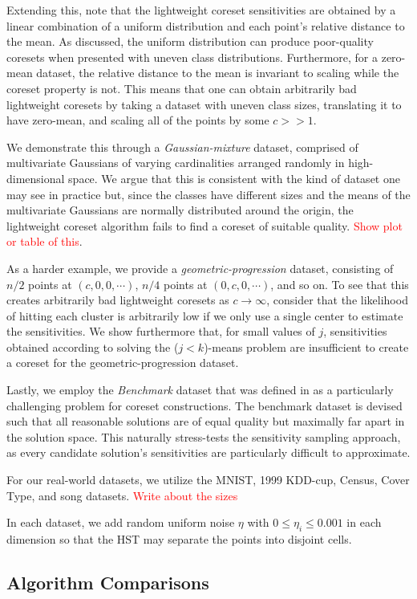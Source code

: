 Extending this, note that the lightweight coreset sensitivities are obtained by a linear combination of a uniform distribution and each point's relative
distance to the mean. As discussed, the uniform distribution can produce poor-quality coresets when presented with uneven class distributions. Furthermore, for
a zero-mean dataset, the relative distance to the mean is invariant to scaling while the coreset property is not. This means that one can obtain arbitrarily
bad lightweight coresets by taking a dataset with uneven class sizes, translating it to have zero-mean, and scaling all of the points by some $c >> 1$.

We demonstrate this through a \emph{Gaussian-mixture} dataset, comprised of multivariate Gaussians of varying cardinalities arranged randomly in
high-dimensional space. We argue that this is consistent with the kind of dataset one may see in practice but, since the classes have different sizes and the
means of the multivariate Gaussians are normally distributed around the origin, the lightweight coreset algorithm fails to find a coreset of suitable
quality. \textcolor{red}{Show plot or table of this}.

As a harder example, we provide a \emph{geometric-progression} dataset, consisting of $n/2$ points at $(c, 0, 0, \cdots)$, $n/4$ points at $(0, c, 0, \cdots)$,
and so on. To see that this creates arbitrarily bad lightweight coresets as $c \rightarrow \infty$, consider that the likelihood of hitting each cluster is
arbitrarily low if we only use a single center to estimate the sensitivities. We show furthermore that, for small values of $j$, sensitivities obtained
according to solving the ($j<k$)-means problem are insufficient to create a coreset for the geometric-progression dataset.

Lastly, we employ the \emph{Benchmark} dataset that was defined in \cite{chrisESA} as a particularly challenging problem for coreset constructions.  The
benchmark dataset is devised such that all reasonable solutions are of equal quality but maximally far apart in the solution space. This naturally stress-tests
the sensitivity sampling approach, as every candidate solution's sensitivities are particularly difficult to approximate.

For our real-world datasets, we utilize the MNIST, 1999 KDD-cup, Census, Cover Type, and song datasets. \textcolor{red}{Write about the sizes}

In each dataset, we add random uniform noise $\eta$ with $0 \leq \eta_i \leq 0.001$ in each dimension so that the HST may separate the points into disjoint
cells.

\subsection{Algorithm Comparisons}
\label{ssec:alg_qualities}






